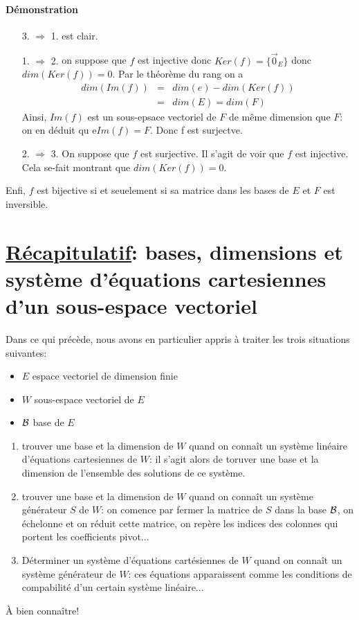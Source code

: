 \paragraph{Démonstration} 
\begin{itemize}
  \item[3. $\Rightarrow$ 1.] est clair.
  \item[1. $\Rightarrow$ 2.] on suppose que $f$ est injective donc $Ker(f) = \{\vec{0}_E\}$ donc $dim(Ker(f)) = 0$. Par le théorème du rang on a
    \begin{eqnarray*}
      dim(Im(f)) &=& dim(e) - dim(Ker(f)) \\
        &=& dim(E) = dim(F)
    \end{eqnarray*}
    Ainsi, $Im(f)$ est un sous-epsace vectoriel de $F$ de même dimension que $F$: on en déduit qu e$Im(f) = F$. Donc f est surjectve.
  \item[2. $ \Rightarrow$ 3.] On suppose que $f$ est surjective. Il s'agit de voir que $f$ est injective. Cela se-fait montrant que $dim(Ker(f)) = 0$. 
\end{itemize}
Enfi, $f$ est bijective si et seuelement si sa matrice dans les bases de $E$ et $F$ est inversible.

%
%
\section[Récapitulatif]{\underline{Récapitulatif}: bases, dimensions et système d'équations cartesiennes d'un sous-espace vectoriel}
%
%
Dans ce qui précède, nous avons en particulier appris à traiter les trois situations suivantes:
\begin{itemize}
  \item $E$ espace vectoriel de dimension finie
  \item $W$ sous-espace vectoriel de $E$
  \item $\mathcal{B}$ base de $E$
\end{itemize}

\begin{enumerate}
  \item trouver une base et la dimension de $W$ quand on  connaît un système linéaire d'équations cartesiennes de $W$: il s'agit alors de toruver une base et la dimension de l'ensemble des solutions de ce système.
  \item trouver une base et la dimension de $W$ quand on connaît un système générateur $S$ de $W$: on comence par fermer la matrice de $S$ dans la base $\mathcal{B}$, on échelonne et on réduit cette matrice, on repère les indices des colonnes qui portent les coefficients pivot...
  \item Déterminer un système d'équations cartésiennes de $W$ quand on connaît un système générateur de $W$: ces équations apparaissent comme les conditions de compabilité d'un certain système linéaire...
\end{enumerate}
À bien connaître!
